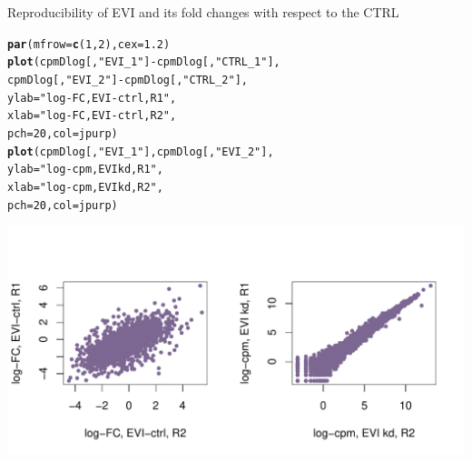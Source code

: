 \documentclass[a4paper]{article}
\makeatletter
\def\maxwidth{ %
  \ifdim\Gin@nat@width>\linewidth
    \linewidth
  \else
    \Gin@nat@width
  \fi
}
\newcommand{\hlnum}[1]{\textcolor[rgb]{0.686,0.059,0.569}{#1}}%
\newcommand{\hlstr}[1]{\textcolor[rgb]{0.192,0.494,0.8}{#1}}%
\newcommand{\hlopt}[1]{\textcolor[rgb]{0,0,0}{#1}}%
\newcommand{\hlstd}[1]{\textcolor[rgb]{0.345,0.345,0.345}{#1}}%
\newcommand{\hlkwc}[1]{\textcolor[rgb]{0.333,0.667,0.333}{#1}}%
\newcommand{\hlkwd}[1]{\textcolor[rgb]{0.737,0.353,0.396}{\textbf{#1}}}%
\newenvironment{kframe}{%
 \def\at@end@of@kframe{}%
 \ifinner\ifhmode%
  \def\at@end@of@kframe{\end{minipage}}%
  \begin{minipage}{\columnwidth}%
 \fi\fi%
 \def\FrameCommand##1{\hskip\@totalleftmargin \hskip-\fboxsep
 \colorbox{shadecolor}{##1}\hskip-\fboxsep
     \hskip-\linewidth \hskip-\@totalleftmargin \hskip\columnwidth}%
 \MakeFramed {\advance\hsize-\width
   \@totalleftmargin\z@ \linewidth\hsize
   \@setminipage}}%
 {\par\unskip\endMakeFramed%
 \at@end@of@kframe}
\newenvironment{knitrout}{}{} %
\makeatother
\begin{document}
Reproducibility of EVI and its fold changes with respect to the CTRL
\begin{knitrout}
\color{fgcolor}\begin{kframe}
\begin{alltt}
\hlkwd{par}\hlstd{(}\hlkwc{mfrow}\hlstd{=}\hlkwd{c}\hlstd{(}\hlnum{1}\hlstd{,}\hlnum{2}\hlstd{),} \hlkwc{cex}\hlstd{=}\hlnum{1.2}\hlstd{)}
\hlkwd{plot}\hlstd{(cpmDlog[,}\hlstr{"EVI_1"}\hlstd{]}\hlopt{-}\hlstd{cpmDlog[,}\hlstr{"CTRL_1"}\hlstd{],}
     \hlstd{cpmDlog[,}\hlstr{"EVI_2"}\hlstd{]}\hlopt{-}\hlstd{cpmDlog[,}\hlstr{"CTRL_2"}\hlstd{],}
     \hlkwc{ylab}\hlstd{=}\hlstr{"log-FC, EVI-ctrl, R1"}\hlstd{,}
     \hlkwc{xlab}\hlstd{=}\hlstr{"log-FC, EVI-ctrl, R2"}\hlstd{,}
     \hlkwc{pch}\hlstd{=}\hlnum{20}\hlstd{,} \hlkwc{col}\hlstd{=jpurp)}
\hlkwd{plot}\hlstd{(cpmDlog[,}\hlstr{"EVI_1"}\hlstd{], cpmDlog[,}\hlstr{"EVI_2"}\hlstd{],}
     \hlkwc{ylab}\hlstd{=}\hlstr{"log-cpm, EVI kd, R1"}\hlstd{,}
     \hlkwc{xlab}\hlstd{=}\hlstr{"log-cpm, EVI kd, R2"}\hlstd{,}
     \hlkwc{pch}\hlstd{=}\hlnum{20}\hlstd{,} \hlkwc{col}\hlstd{=jpurp)}
\end{alltt}
\end{kframe}
\includegraphics[width=\maxwidth]{figure/voomRepEVI} 

\end{knitrout}
\end{document}

